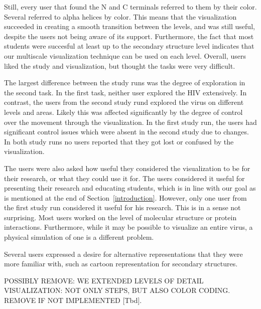 \documentclass[review,journal]{vgtc}         %
\begin{document}
	Still, every user that found the N and C terminals referred to them by their color. 
	Several referred to alpha helices by color. 
	This means that the visualization succeeded in creating a smooth transition between the levels, and was still useful, despite the users not being aware of its support. 
	Furthermore, the fact that most students were succesful at least up to the secondary structure level indicates that our multiscale visualization technique can be used on each level. 
	Overall, users liked the study and visualization, but thought the tasks were very difficult.
	
	
	The largest difference between the study runs was the degree of exploration in the second task. In the first task, neither user explored the HIV extensively. In contrast, the users from the second study rund explored the virus on different levels and areas. Likely this was affected significantly by the degree of control over the movement through the visualization. In the first study run, the users had significant control issues which were absent in the second study due to changes. In both study runs no users reported that they got lost or confused by the visualization.
	
	The users were also asked how useful they considered the visualization to be for their research, or what they could use it for. The users considered it useful for presenting their research and educating students, which is in line with our goal as is mentioned at the end of Section~\ref{introduction}. However, only one user from the first study run considered it useful for his research. This is in a sense not surprising. Most users worked on the level of molecular structure or protein interactions. Furthermore, while it may be possible to visualize an entire virus, a physical simulation of one is a different problem. 
	
	
	Several users expressed a desire for alternative representations that they were more familiar with, such as cartoon representation for secondary structures.
	
	POSSIBLY REMOVE: WE EXTENDED LEVELS OF DETAIL VISUALIZATION: NOT ONLY STEPS, BUT ALSO COLOR CODING. REMOVE IF NOT IMPLEMENTED [Tbd].
	
	
	
	
	
	
	
\end{document}
